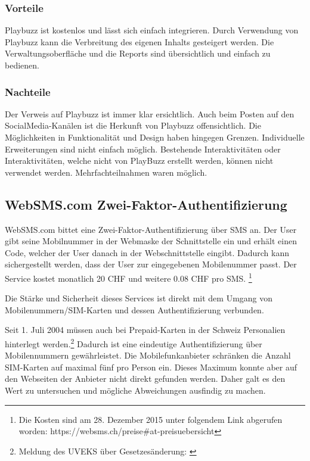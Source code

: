 \subsubsection{Vorteile}\label{vorteile-1}

Playbuzz ist kostenlos und lässt sich einfach integrieren. Durch
Verwendung von Playbuzz kann die Verbreitung des eigenen Inhalts
gesteigert werden. Die Verwaltungsoberfläche und die Reports sind
übersichtlich und einfach zu bedienen.

\subsubsection{Nachteile}\label{nachteile-1}

Der Verweis auf Playbuzz ist immer klar ersichtlich. Auch beim Posten
auf den SocialMedia-Kanälen ist die Herkunft von Playbuzz
offensichtlich. Die Möglichkeiten in Funktionalität und Design haben
hingegen Grenzen. Individuelle Erweiterungen sind nicht einfach möglich.
Bestehende Interaktivitäten oder Interaktivitäten, welche nicht von
PlayBuzz erstellt werden, können nicht verwendet werden.
Mehrfachteilnahmen waren möglich.

\newpage

\subsection{WebSMS.com
Zwei-Faktor-Authentifizierung}\label{websms.com-zwei-faktor-authentifizierung}

WebSMS.com bittet eine Zwei-Faktor-Authentifizierung über SMS an. Der
User gibt seine Mobilnummer in der Webmaske der Schnittstelle ein und
erhält einen Code, welcher der User danach in der Webschnittstelle
eingibt. Dadurch kann sichergestellt werden, dass der User zur
eingegebenen Mobilenummer passt. Der Service kostet monatlich 20 CHF und
weitere 0.08 CHF pro SMS. \footnote{Die Kosten sind am 28. Dezember 2015
  unter folgendem Link abgerufen worden:
  https://websms.ch/preise\#at-preisuebersicht}

Die Stärke und Sicherheit dieses Services ist direkt mit dem Umgang von
Mobilenummern/SIM-Karten und dessen Authentifizierung verbunden.

Seit 1. Juli 2004 müssen auch bei Prepaid-Karten in der Schweiz
Personalien hinterlegt werden.\footnote{Meldung des UVEKS über
  Gesetzesänderung: \autocite{uvek}} Dadurch ist eine eindeutige
Authentifizierung über Mobilennummern gewährleistet. Die
Mobilefunkanbieter schränken die Anzahl SIM-Karten auf maximal fünf pro
Person ein. Dieses Maximum konnte aber auf den Webseiten der Anbieter
nicht direkt gefunden werden. Daher galt es den Wert zu untersuchen und
mögliche Abweichungen ausfindig zu machen.

